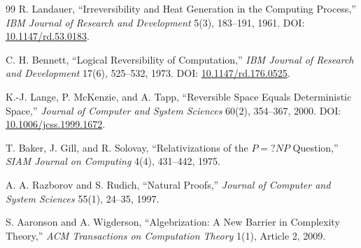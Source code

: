 \documentclass[11pt]{article}
\begin{document}
\begin{thebibliography}{99}
R. Landauer, ``Irreversibility and Heat Generation in the Computing
Process,'' \emph{IBM Journal of Research and Development} 5(3), 183--191,
1961. DOI: \href{https://doi.org/10.1147/rd.53.0183}{10.1147/rd.53.0183}.

C. H. Bennett, ``Logical Reversibility of Computation,'' \emph{IBM Journal of
Research and Development} 17(6), 525--532, 1973.
DOI: \href{https://doi.org/10.1147/rd.176.0525}{10.1147/rd.176.0525}.

K.-J. Lange, P. McKenzie, and A. Tapp, ``Reversible Space Equals
Deterministic Space,'' \emph{Journal of Computer and System Sciences} 60(2),
354--367, 2000. DOI:
\href{https://doi.org/10.1006/jcss.1999.1672}{10.1006/jcss.1999.1672}.

T. Baker, J. Gill, and R. Solovay, ``Relativizations of the $P=?NP$
Question,'' \emph{SIAM Journal on Computing} 4(4), 431--442, 1975.

A. A. Razborov and S. Rudich, ``Natural Proofs,'' \emph{Journal of Computer
and System Sciences} 55(1), 24--35, 1997.

S. Aaronson and A. Wigderson, ``Algebrization: A New Barrier in Complexity
Theory,'' \emph{ACM Transactions on Computation Theory} 1(1), Article 2,
2009.
\end{thebibliography}
\end{document}
